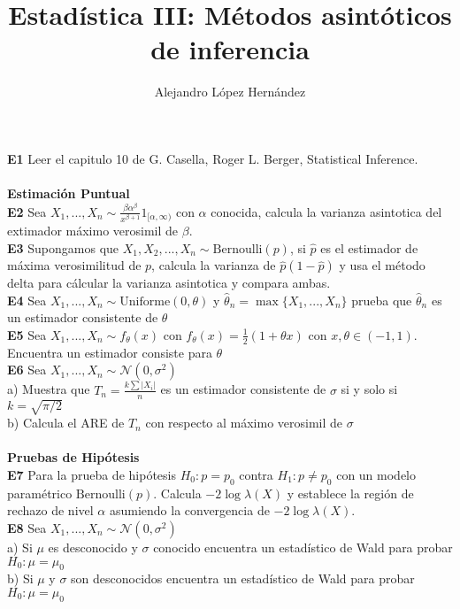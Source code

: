 \documentclass[11pt,spanish]{article}
\title{Estadística III: Métodos asintóticos de inferencia}
\author{Alejandro López Hernández}
\begin{document}
\maketitle
\setlength\parindent{0pt}
\textbf{E1} Leer el capitulo 10 de G. Casella, Roger L. Berger, Statistical Inference\cite{Casella}. \\\\
\textbf{Estimación Puntual} \\
\textbf{E2} Sea $X_1,...,X_n\sim\frac{\beta\alpha^\beta}{x^{\beta+1}}1_{[\alpha,\infty)}$ con $\alpha$ conocida, calcula la varianza asintotica del extimador máximo verosimil de $\beta$.  \\
\textbf{E3} Supongamos que $X_1,X_2,...,X_n\sim\text{Bernoulli}(p)$, si $\hat{p}$ es el estimador de máxima verosimilitud de $p$, calcula la varianza de $\hat{p}(1-\hat{p})$ y usa el método delta para cálcular la varianza asintotica y compara ambas. \\
\textbf{E4} Sea $X_1,...,X_n\sim \text{Uniforme}(0,\theta)$ y $\hat\theta_n=\max\{X_1,...,X_n\}$ prueba que $\hat\theta_n$ es un estimador consistente de $\theta$\\
\textbf{E5} Sea $X_1,...,X_n\sim f_\theta (x)$ con $f_\theta (x)=\frac{1}{2}(1+\theta x)$ con $x,\theta \in (-1,1)$. Encuentra un estimador consiste para $\theta$ \\
\textbf{E6} Sea $X_1,...,X_n\sim \mathcal{N}(0,\sigma^2)$ \\
\hspace*{6mm} a) Muestra que $T_n=\frac{k\sum |X_i|}{n}$ es un estimador consistente de $\sigma$ si y solo si $k=\sqrt{\pi/2}$\\
\hspace*{6mm} b) Calcula el ARE de $T_n$ con respecto al máximo verosimil de $\sigma$\\\\
\textbf{Pruebas de Hipótesis}\\
\textbf{E7} Para la prueba de hipótesis $H_0:p=p_0$ contra $H_1:p\neq p_0$ con un modelo paramétrico $\text{Bernoulli}(p)$. Calcula $-2\log{\lambda(X)}$ y establece la región de rechazo de nivel $\alpha$ asumiendo la convergencia de $-2\log{\lambda(X)}$.\\
\textbf{E8} Sea $X_1,...,X_n\sim \mathcal{N}(0,\sigma^2)$\\
\hspace*{6mm} a) Si $\mu$ es desconocido y $\sigma$ conocido encuentra un estadístico de Wald para probar $H_0:\mu=\mu_0$\\
\hspace*{6mm} b) Si $\mu$ y $\sigma$ son desconocidos encuentra un estadístico de Wald para probar $H_0:\mu=\mu_0$\\
\end{document}
